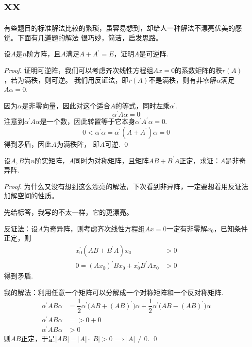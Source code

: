 \section{xx}

有些题目的标准解法比较的繁琐，虽容易想到，却给人一种解法不漂亮优美的感觉。下面有几道题的解法
很巧妙，简洁，启发思路。

\begin{proposition}
	设$A$是$n$阶方阵，且$A$满足$A+A^\prime = E$，证明$A$是可逆阵.
\end{proposition}

\begin{proof}
	证明可逆阵，我们可以考虑齐次线性方程组$Ax=0$的系数矩阵的秩$r(A)$，若为满秩，则可逆。
	我们用反证法，即$r(A)$不是满秩，则有非零解$\alpha$满足$A\alpha = 0$.
	
	因为$\alpha$是非零向量，因此对这个适合$A$的等式，同时左乘$\alpha^\prime$.
	$$
		\alpha^\prime A \alpha = 0
	$$
	注意到$\alpha^\prime A \alpha$是一个数，因此转置等于它本身$\alpha^\prime A^\prime \alpha=0$.
	$$
		0 < \alpha^\prime \alpha = \alpha^\prime (A + A^\prime) \alpha = 0
	$$
	得到矛盾，因此$A$为满秩阵， 即$A$可逆.
	\qed
\end{proof}

\begin{ex}[北师大 2017]
	设$A,B$为$n$阶实矩阵，$A$同时为对称矩阵，且矩阵$AB+B^\prime A$正定，求证：$A$是非奇异阵.
\end{ex}

\begin{proof}
	为什么又没有想到这么漂亮的解法，下次看到非异阵，一定要想着用反证法加解空间的性质。

	先给标答，我写的不太一样，它的更漂亮。

	反证法：设$A$为奇异阵，则考虑齐次线性方程组$Ax=0$一定有非零解$x_0$，已知条件正定，则
	\begin{align*}
		x_0^\prime (AB+B^\prime A)x_0 &> 0 \\ 
		0=(A x_0)^\prime B x_0  + x_0 ^\prime B^\prime A x_0 &> 0
	\end{align*}
	得到矛盾.

	我的解法：利用任意一个矩阵可以分解成一个对称矩阵和一个反对称矩阵.
	\begin{align*}
		\alpha^\prime AB \alpha &= \dfrac{1}{2}\alpha^\prime \bigl(AB + (AB)^\prime\bigr) \alpha +  \dfrac{1}{2}\alpha^\prime \bigl( AB - (AB)^\prime\bigr) \alpha \\
		\alpha^\prime AB \alpha &= >0 + 0 \\
		\alpha^\prime AB \alpha &> 0  
	\end{align*}
	则$AB$正定，于是$|AB|=|A|\cdot |B| > 0 \implies |A| \neq 0$.
	\qed{}
\end{proof}

